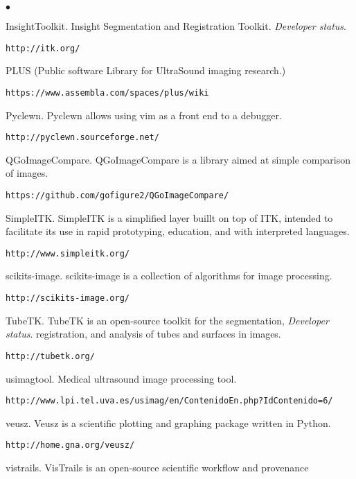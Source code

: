 \documentclass[margin,line]{res}
\newenvironment{list2}{
  \begin{list}{$\bullet$}{%
      \setlength{\itemsep}{0in}
      \setlength{\parsep}{0in} \setlength{\parskip}{0in}
      \setlength{\topsep}{0in} \setlength{\partopsep}{0in}
      \setlength{\leftmargin}{0.2in}}}{\end{list}}
\begin{document}
\begin{resume}
\begin{list2}
\item InsightToolkit.  Insight Segmentation and Registration Toolkit.  \textit{Developer status}.
  \begin{verbatim}http://itk.org/\end{verbatim}
\item PLUS (Public software Library for UltraSound imaging research.)
  \begin{verbatim}https://www.assembla.com/spaces/plus/wiki\end{verbatim}
\item Pyclewn.  Pyclewn allows using vim as a front end to a debugger.
  \begin{verbatim}http://pyclewn.sourceforge.net/\end{verbatim}
\item QGoImageCompare.  QGoImageCompare is a library aimed at simple comparison
  of images.
  \begin{verbatim}https://github.com/gofigure2/QGoImageCompare/\end{verbatim}
\item SimpleITK.  SimpleITK is a simplified layer buillt on top of ITK, intended
  to facilitate its use in rapid prototyping, education, and with interpreted
  languages.
  \begin{verbatim}http://www.simpleitk.org/\end{verbatim}
\item scikits-image.  scikits-image is a collection of algorithms for image
  processing.
  \begin{verbatim}http://scikits-image.org/\end{verbatim}
\item TubeTK.  TubeTK is an open-source toolkit for the segmentation, \textit{Developer status}.
  registration, and analysis of tubes and surfaces in images.
  \begin{verbatim}http://tubetk.org/\end{verbatim}
\item usimagtool.  Medical ultrasound image processing tool.
  \begin{verbatim}http://www.lpi.tel.uva.es/usimag/en/ContenidoEn.php?IdContenido=6/\end{verbatim}
\item veusz.  Veusz is a scientific plotting and graphing package written in
  Python.  \begin{verbatim}http://home.gna.org/veusz/\end{verbatim}
\item vistrails.  VisTrails is an open-source scientific workflow and provenance

\end{list2}
\end{resume}
\end{document}
